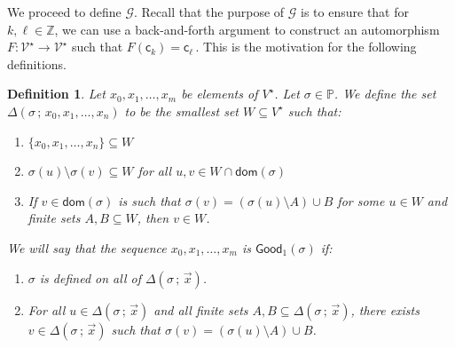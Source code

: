 \documentclass[10pt,a4paper, openany,  oldfontcommands]{memoir}
\newtheorem{definition} [theorem] {Definition}
\newtheorem{open problem} [theorem] {Open Problem}
\begin{document}
We proceed to define   $  \mathcal{G} $. 
   Recall that  the purpose of $   \mathcal{G}   $   is to ensure that  for  $k, \ell   \in   \mathbb{Z} $, 
   we can use a  back-and-forth argument  to construct 
an  automorphism  $  F   :    \mathcal{V}^{  \star }  \to   \mathcal{V}^{ \star }   $  
such that   $   F    \left(   \mathsf{c}_k    \right)    =    \mathsf{c}_ {  \ell }      \,  $. 
 This is the motivation for the following definitions.
 
 
 
 \begin{definition}
  Let $ x_0,  x_1,  \ldots , x_m$ be elements of  $   V^{  \star }  $. 
 Let  $  \sigma   \in   \mathbb{P} $. 
 We define the set  $  \Delta \left(   \sigma  \, ;  \,   x_0,  x_1,  \ldots , x_n  \right)    $ to be the smallest set  $  W   \subseteq V^{  \star }    $  such that: 
 \begin{enumerate}
\item       $   \lbrace x_0,  x_1,  \ldots , x_n  \rbrace    \subseteq  W  $
 
 \item  $   \sigma \left( u  \right)   \setminus   \sigma \left( v  \right)       \subseteq   W    $  
     for all    $ u, v   \in  W  \cap   \mathsf{dom} \left(  \sigma  \right)  $

 
 \item   If  $  v  \in   \mathsf{dom} \left(   \sigma \right)  $  is such that  
 $  \sigma (v)  =  \left(   \sigma (u)  \setminus  A  \right)  \cup B  $  for some  $ u \in  W  $  and finite sets $  A,  B  \subseteq   W  $,  
 then  $  v  \in  W  $. 
 \end{enumerate}
 We will say that  the sequence     $ x_0,  x_1,  \ldots , x_m$    is  $  \mathsf{Good}_1  \left(  \sigma  \right)  $  if: 
 \begin{enumerate}
\item  $  \sigma $  is defined on all of    $   \Delta \left(   \sigma  \, ;  \,   \vec{x}  \right)    $. 



 
\item     For all   $  u  \in    \Delta \left(   \sigma  \, ;  \,   \vec{x}  \right)  $  and all  finite sets 
 $  A, B  \subseteq   \Delta \left(   \sigma  \, ;  \,   \vec{x}  \right)    $, 
  there exists  $  v \in    \Delta \left(   \sigma  \, ;  \,   \vec{x}  \right)    $  such that  
$  \sigma (v)  =  \left(   \sigma (u )  \setminus  A   \right)   \cup   B  $. 
 \end{enumerate}
 \end{definition}
\end{document}
